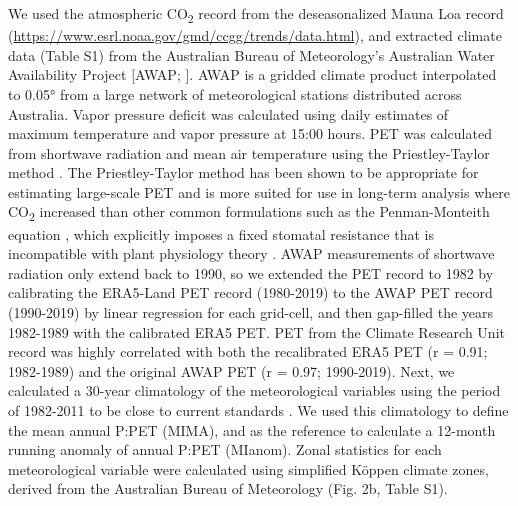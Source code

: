 \documentclass[gc, manuscript]{copernicus}
\begin{document}
We used the atmospheric CO\textsubscript{2} record from the
deseasonalized Mauna Loa record
(\url{https://www.esrl.noaa.gov/gmd/ccgg/trends/data.html}), and
extracted climate data (Table S1) from the Australian Bureau of
Meteorology's Australian Water Availability Project {[}AWAP;
\citet{jonesHighqualitySpatialClimate2009}{]}. AWAP is a gridded climate
product interpolated to 0.05° from a large network of meteorological
stations distributed across Australia. Vapor pressure deficit was
calculated using daily estimates of maximum temperature and vapor
pressure at 15:00 hours. PET was calculated from shortwave radiation and
mean air temperature using the Priestley-Taylor method
\citep{davisSimpleProcessledAlgorithms2017}. The Priestley-Taylor method
has been shown to be appropriate for estimating large-scale PET
\citep{raupachEquilibriumEvaporationConvective2000} and is more suited
for use in long-term analysis where CO\textsubscript{2} increased than
other common formulations such as the Penman-Monteith equation
\citep{greveAridityIndexGlobal2019, milly_dunne16}, which explicitly
imposes a fixed stomatal resistance that is incompatible with plant
physiology theory \citep{medlyn_etal01}. AWAP measurements of shortwave
radiation only extend back to 1990, so we extended the PET record to
1982 by calibrating the ERA5-Land PET record (1980-2019) to the AWAP PET
record (1990-2019) by linear regression for each grid-cell, and then
gap-filled the years 1982-1989 with the calibrated ERA5 PET. PET from
the Climate Research Unit record \citep{harris_etal14} was highly
correlated with both the recalibrated ERA5 PET (r = 0.91; 1982-1989) and
the original AWAP PET (r = 0.97; 1990-2019). Next, we calculated a
30-year climatology of the meteorological variables using the period of
1982-2011 to be close to current standards
\citep{worldmeteorologicalorganizationWMOGuidelinesCalculation2017}. We
used this climatology to define the mean annual P:PET (MIMA), and as the
reference to calculate a 12-month running anomaly of annual P:PET
(MIanom). Zonal statistics for each meteorological variable were
calculated using simplified Köppen climate zones, derived from the
Australian Bureau of Meteorology (Fig. 2b, Table S1).
\end{document}
